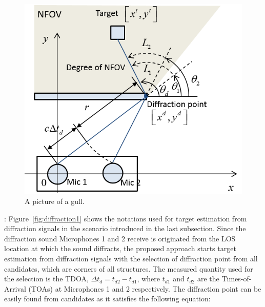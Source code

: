 \documentclass[letterpaper, 10 pt, conference]{ieeeconf}  %
\begin{document}
\begin{figure}[h]
  \caption{A picture of a gull.}
  \centering
	\includegraphics[width=\columnwidth]{Figures/diffraction1}
\end{figure}
: Figure~\ref{fig:diffraction1} shows the notations used for target estimation from diffraction signals in the scenario introduced in the last subsection.  Since the diffraction sound Microphones 1 and 2 receive is originated from the LOS location at which the sound diffracts, the proposed approach starts target estimation from diffraction signals with the selection of diffraction point from all candidates, which are corners of all structures.  The measured quantity used for the selection is the TDOA, $\Delta t_d = t_{d2} - t_{d1}$, where $t_{d1}$ and $t_{d2}$ are the Times-of-Arrival (TOAs) at Microphones 1 and 2 respectively.  The diffraction point can be easily found from candidates as it satisfies the following equation:  
\end{document}
